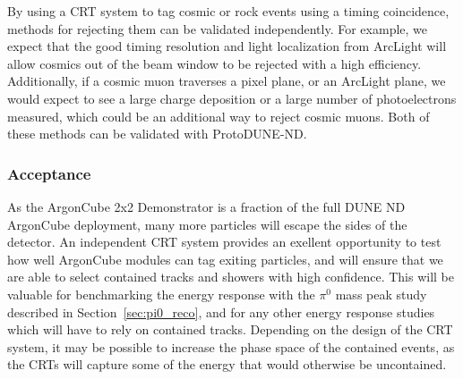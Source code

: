 By using a CRT system to tag cosmic or rock events using a timing coincidence, methods for rejecting them can be validated independently. For example, we expect that the good timing resolution and light localization from ArcLight will allow cosmics out of the beam window to be rejected with a high efficiency. Additionally, if a cosmic muon traverses a pixel plane, or an ArcLight plane, we would expect to see a large charge deposition or a large number of photoelectrons measured, which could be an additional way to reject cosmic muons. Both of these methods can be validated with ProtoDUNE-ND.

\subsubsection{Acceptance}
As the ArgonCube 2x2 Demonstrator is a fraction of the full DUNE ND ArgonCube deployment, many more particles will escape the sides of the detector. An independent CRT system provides an exellent opportunity to test how well ArgonCube modules can tag exiting particles, and will ensure that we are able to select contained tracks and showers with high confidence. This will be valuable for benchmarking the energy response with the $\pi^{0}$ mass peak study described in Section~\ref{sec:pi0_reco}, and for any other energy response studies which will have to rely on contained tracks. Depending on the design of the CRT system, it may be possible to increase the phase space of the contained events, as the CRTs will capture some of the energy that would otherwise be uncontained.
